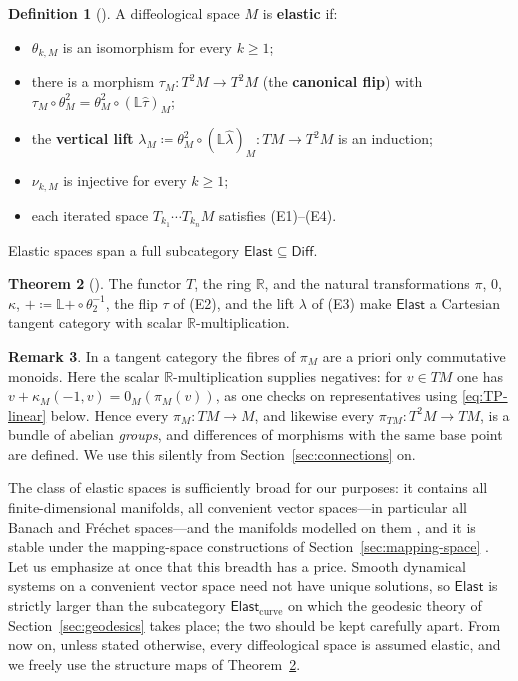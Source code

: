 \documentclass{amsart}
\newcommand{\R}{\mathbb{R}}
\theoremstyle{definition}
\newtheorem{thm}{Theorem}[section]
\newtheorem{defn}[thm]{Definition}
\newtheorem{rem}[thm]{Remark}
\begin{document}
\begin{defn}[{\cite[Definition~4.1]{B23}}]\label{def:tangent-structure-1}
  A diffeological space $M$ is \textbf{elastic} if:
  \begin{itemize}
    \item[(E1)] $\theta_{k,M}$ is an isomorphism for every $k \geq 1$;
    \item[(E2)] there is a morphism $\tau_M \colon T^2M \to T^2M$ (the
      \textbf{canonical flip}) with
      $\tau_M \circ \theta^2_M = \theta^2_M \circ (\mathbb{L}\hat{\tau})_M$;
    \item[(E3)] the \textbf{vertical lift}
      $\lambda_M \coloneqq \theta^2_M \circ (\mathbb{L}\hat{\lambda})_M
      \colon TM \to T^2M$ is an induction;
    \item[(E4)] $\nu_{k,M}$ is injective for every $k \geq 1$;
    \item[(E5)] each iterated space $T_{k_1}\cdots T_{k_n}M$ satisfies
      (E1)--(E4).
  \end{itemize}
  Elastic spaces span a full subcategory
  $\mathsf{Elast} \subseteq \mathsf{Diff}$.
\end{defn}

\begin{thm}[{\cite[Theorem~4.2]{B23}}]\label{thm:tangent-structure-2}
  The functor $T$, the ring $\R$, and the natural transformations $\pi$, $0$,
  $\kappa$, $+ \coloneqq \mathbb{L}\hat{+} \circ \theta_2^{-1}$, the flip
  $\tau$ of \textup{(E2)}, and the lift $\lambda$ of \textup{(E3)} make
  $\mathsf{Elast}$ a Cartesian tangent category with scalar
  $\R$-multiplication.
\end{thm}

\begin{rem}\label{rem:negatives}
In a tangent category the fibres of $\pi_M$ are a priori only commutative
monoids. Here the scalar $\R$-multiplication supplies negatives: for
$v \in TM$ one has
$v + \kappa_M(-1, v) = 0_M(\pi_M(v))$, as one checks on representatives using
\eqref{eq:TP-linear} below. Hence every $\pi_M \colon TM \to M$, and likewise
every $\pi_{TM} \colon T^2M \to TM$, is a bundle of abelian \emph{groups}, and
differences of morphisms with the same base point are defined. We use this
silently from Section~\ref{sec:connections} on.
\end{rem}

The class of elastic spaces is sufficiently broad for our purposes: it contains
all finite-dimensional manifolds, all convenient vector spaces---in particular
all Banach and Fr\'echet spaces---and the manifolds modelled on them
\cite[Section~2.1]{M}, and it is stable under the mapping-space constructions
of Section~\ref{sec:mapping-space} \cite{B23}. Let us emphasize at once that
this breadth has a price. Smooth dynamical systems on a convenient vector space
need not have unique solutions, so $\mathsf{Elast}$ is strictly larger than the
subcategory $\mathsf{Elast}_{\mathrm{curve}}$ on which the geodesic theory of
Section~\ref{sec:geodesics} takes place; the two should be kept carefully
apart. From now on, unless stated otherwise, every diffeological space is
assumed elastic, and we freely use the structure maps of
Theorem~\ref{thm:tangent-structure-2}.
\end{document}
